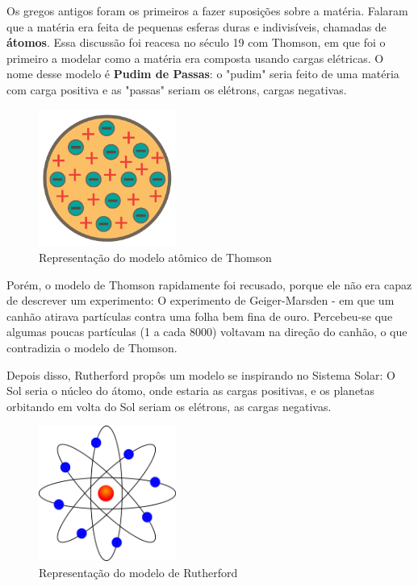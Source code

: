 \documentclass[12pt]{extarticle}
\newcommand{\<}{\langle}
\renewcommand{\>}{\rangle}
\theoremstyle{definition}
\begin{document}
Os gregos antigos foram os primeiros a fazer suposições sobre a matéria. Falaram que a matéria era feita de pequenas esferas duras e indivisíveis, chamadas de \textbf{átomos}. Essa discussão foi reacesa no século 19 com Thomson, em que foi o primeiro a modelar como a matéria era composta usando cargas elétricas.  O nome desse modelo é \textbf{Pudim de Passas}: o "pudim" seria feito de uma matéria com carga positiva e as "passas" seriam os elétrons, cargas negativas.
\begin{figure}[H]
    \centering
    \includegraphics[width=0.4\textwidth]{representacao-dos-eletrons-fluido-positivo-no-modelo-atomico-thomson-5880b350bbb81.jpg}
    \caption{Representação do modelo atômico de Thomson}
    \label{fig:ex_2}
\end{figure}

Porém, o modelo de Thomson rapidamente foi recusado, porque ele não era capaz de descrever um experimento: O experimento de Geiger-Marsden - em que um canhão atirava partículas contra uma folha bem fina de ouro. Percebeu-se que algumas poucas partículas (1 a cada 8000) voltavam na direção do canhão, o que contradizia o modelo de Thomson.

Depois disso, Rutherford propôs um modelo se inspirando no Sistema Solar: O Sol seria o núcleo do átomo, onde estaria as cargas positivas, e os planetas orbitando em volta do Sol seriam os elétrons, as cargas negativas.
\begin{figure}[H]
    \centering
    \includegraphics[width=0.4\textwidth]{b0653c823d734f39a11e617eaa929fab-467.png}
    \caption{Representação do modelo de Rutherford}
    \label{fig:ex_3}
\end{figure}
\end{document}
